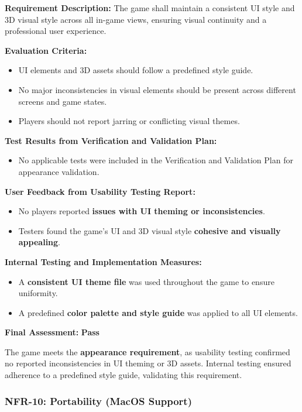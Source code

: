 \documentclass[12pt, titlepage]{article}
\begin{document}
\textbf{Requirement Description:}  
The game shall maintain a consistent UI style and 3D visual style across all in-game views, ensuring visual continuity and a professional user experience.

\textbf{Evaluation Criteria:}  
\begin{itemize}
    \item UI elements and 3D assets should follow a predefined style guide.
    \item No major inconsistencies in visual elements should be present across different screens and game states.
    \item Players should not report jarring or conflicting visual themes.
\end{itemize}

\textbf{Test Results from Verification and Validation Plan:}  
\begin{itemize}
    \item No applicable tests were included in the Verification and Validation Plan for appearance validation.
\end{itemize}

\textbf{User Feedback from Usability Testing Report:}  
\begin{itemize}
    \item No players reported \textbf{issues with UI theming or inconsistencies}.
    \item Testers found the game’s UI and 3D visual style \textbf{cohesive and visually appealing}.
\end{itemize}

\textbf{Internal Testing and Implementation Measures:}  
\begin{itemize}
    \item A \textbf{consistent UI theme file} was used throughout the game to ensure uniformity.
    \item A predefined \textbf{color palette and style guide} was applied to all UI elements.
\end{itemize}

\textbf{Final Assessment:} \textbf{Pass}  

The game meets the \textbf{appearance requirement}, as usability testing confirmed no reported inconsistencies in UI theming or 3D assets. Internal testing ensured adherence to a predefined style guide, validating this requirement.


\subsubsection{NFR-10: Portability (MacOS Support)}
\end{document}
